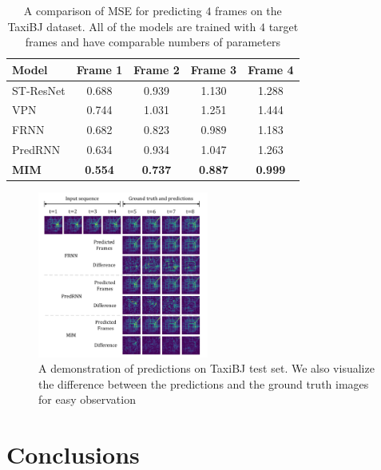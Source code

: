 \documentclass[10pt,twocolumn,letterpaper]{article}
\begin{document}
\begin{table}[h]
  \caption{A comparison of MSE for predicting $4$ frames on the TaxiBJ dataset. All of the models are trained with $4$ target frames and have comparable numbers of parameters}
  \label{tab:taxibj_4_result}
  \vskip 0.15in
  \centering
  \begin{small}
  \begin{sc}
  \renewcommand{\multirowsetup}{\centering}  
  \begin{tabular}{lcccc}
    \toprule
    Model & Frame 1 & Frame 2 & Frame 3 & Frame 4\\
    \midrule
    ST-ResNet & 0.688 & 0.939 & 1.130 & 1.288 \\ 
    VPN & 0.744 & 1.031 & 1.251 & 1.444 \\ 
    FRNN & 0.682 & 0.823 & 0.989 & 1.183 \\ 
    PredRNN & 0.634 & 0.934 & 1.047 & 1.263 \\
    \midrule
    \textbf{MIM} & \textbf{0.554} & \textbf{0.737} & \textbf{0.887} & \textbf{0.999} \\
    \bottomrule
  \end{tabular}
  \end{sc}
  \end{small}
\end{table}

\begin{figure}[h]
  \centering
  \includegraphics[width=0.5\textwidth]{fig/taxibj.pdf}
  \caption{A demonstration of predictions on TaxiBJ test set. We also visualize the difference between the predictions and the ground truth images for easy observation}
  \label{fig:taxibj_results}
\end{figure}

\section{Conclusions}
\end{document}
